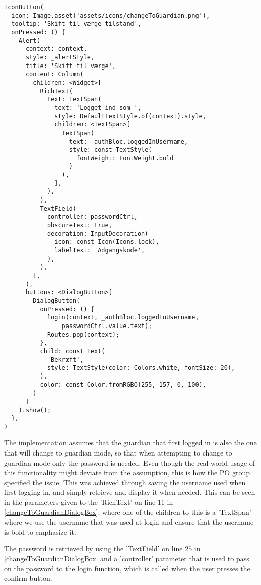 \begin{lstlisting}[caption={Dialogbox for confirming password},captionpos=b, label=changeToGuardianDialogBox]
IconButton(
  icon: Image.asset('assets/icons/changeToGuardian.png'),
  tooltip: 'Skift til værge tilstand',
  onPressed: () {
    Alert(
      context: context,
      style: _alertStyle,
      title: 'Skift til værge',
      content: Column(
        children: <Widget>[
          RichText(
            text: TextSpan(
              text: 'Logget ind som ',
              style: DefaultTextStyle.of(context).style,
              children: <TextSpan>[
                TextSpan(
                  text: _authBloc.loggedInUsername,
                  style: const TextStyle(
                    fontWeight: FontWeight.bold
                  )
                ),
              ],
            ),
          ),
          TextField(
            controller: passwordCtrl,
            obscureText: true,
            decoration: InputDecoration(
              icon: const Icon(Icons.lock),
              labelText: 'Adgangskode',
            ),
          ),
        ],
      ),
      buttons: <DialogButton>[
        DialogButton(
          onPressed: () {
            login(context, _authBloc.loggedInUsername,
                passwordCtrl.value.text);
            Routes.pop(context);
          },
          child: const Text(
            'Bekræft',
            style: TextStyle(color: Colors.white, fontSize: 20),
          ),
          color: const Color.fromRGBO(255, 157, 0, 100),
        )
      ]
    ).show();
  },
)
\end{lstlisting}

The implementation assumes that the guardian that first logged in is also the one that will change to guardian mode, so that when attempting to change to guardian mode only the password is needed.
Even though the real world usage of this functionality might deviate from the assumption, this is how the PO group specified the issue.
This was achieved through saving the username used when first logging in, and simply retrieve and display it when needed.
This can be seen in the parameters given to the 'RichText' on line $11$ in \autoref{changeToGuardianDialogBox}, where one of the children to this is a 'TextSpan' where we use the username that was used at login and ensure that the username is bold to emphasize it.

The password is retrieved by using the 'TextField' on line $25$ in \autoref{changeToGuardianDialogBox} and a 'controller' parameter that is used to pass on the password to the login function, which is called when the user presses the confirm button.

